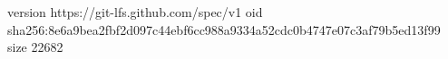 version https://git-lfs.github.com/spec/v1
oid sha256:8e6a9bea2fbf2d097c44ebf6cc988a9334a52cdc0b4747e07c3af79b5ed13f99
size 22682

